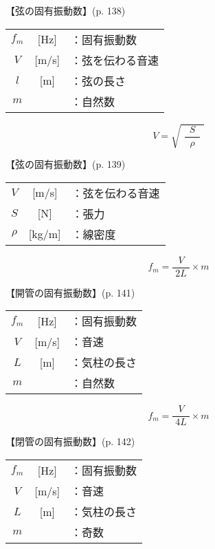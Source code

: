 \documentclass[10pt]{jarticle}
\begin{document}
\vskip3mm
【弦の固有振動数】{\footnotesize (p. 138)}

\begin{tabular}{ccl}
$f_m$	&[Hz]	&：固有振動数\\
$V$	&[m/s]	&：弦を伝わる音速\\
$l$	&[m]	&：弦の長さ\\
$m$	&	&：自然数\\
\end{tabular}

\newpage




\[
V = \sqrt{\,\, \frac{S}{\;\; \rho \;\;}\,\,}
\]


\vskip3mm
【弦の固有振動数】{\footnotesize (p. 139)}

\begin{tabular}{ccl}
$V$	&[m/s]	&：弦を伝わる音速\\
$S$	&[N]	&：張力\\
$\rho$	&[kg/m]	&：線密度\\
\end{tabular}

\newpage





\[
f_m = \frac{V}{\; 2L \;}\times m
\]


\vskip3mm
【開管の固有振動数】{\footnotesize (p. 141)}

\begin{tabular}{ccl}
$f_m$	&[Hz]	&：固有振動数\\
$V$	&[m/s]	&：音速\\
$L$	&[m]	&：気柱の長さ\\
$m$	&	&：自然数\\
\end{tabular}

\newpage





\[
f_m = \frac{V}{\; 4L \;}\times m
\]


\vskip3mm
【閉管の固有振動数】{\footnotesize (p. 142)}

\begin{tabular}{ccl}
$f_m$	&[Hz]	&：固有振動数\\
$V$	&[m/s]	&：音速\\
$L$	&[m]	&：気柱の長さ\\
$m$	&	&：奇数\\
\end{tabular}
\end{document}
